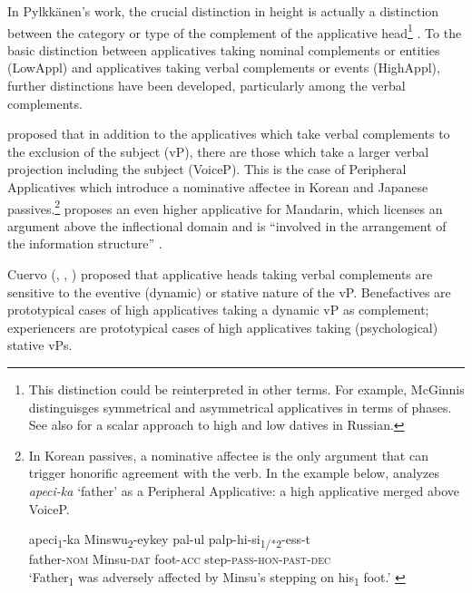 \documentclass[output=paper,colorlinks,citecolor=brown,nonflat]{./langscibook}
\begin{document}
In Pylkkänen’s work, the crucial distinction in height is actually a distinction between the category or type of the complement of the applicative head\footnote{This distinction could be reinterpreted in other terms. For example, McGinnis distinguisges symmetrical and asymmetrical applicatives in terms of phases. See also \citet{BonehNash2017} for a scalar approach to high and low datives in Russian.} . To the basic distinction between applicatives taking nominal complements or entities (LowAppl) and applicatives taking verbal complements or events (HighAppl), further distinctions have been developed, particularly among the verbal complements. 

\citet{Kim2011high} proposed that in addition to the applicatives which take verbal complements to the exclusion of the subject (vP), there are those which take a larger verbal projection including the subject (VoiceP). This is the case of Peripheral Applicatives which introduce a nominative affectee in Korean and Japanese passives.\footnote{In Korean passives, a nominative affectee is the only argument that can trigger honorific agreement with the verb. In the example below, \citet{Kim2012affectees} analyzes \textit{apeci-ka} ‘father’ as a Peripheral Applicative: a high applicative merged above VoiceP.

\ea%
    \gll apeci\textsubscript{1}-ka Minswu\textsubscript{2}-eykey pal-ul palp-hi-si\textsubscript{1/*2}-ess-t\\
    father\textsc{-nom}  Minsu\textsc{-dat} foot\textsc{-acc}   step\textsc{-pass-hon-past-dec}\\
    \glt ‘Father\textsubscript{1} was adversely affected by Minsu’s stepping on his\textsubscript{1} foot.’  \citep{Kim2012affectees}
    \z
} \citet{Tsai2018} proposes an even higher applicative for Mandarin, which licenses an argument above the inflectional domain and is “involved in the arrangement of the information structure” \citep[18]{Tsai2018}. 


Cuervo (\citeyear{Cuervo2003}, \citeyear{Cuervo2011}, \citeyear{Cuervo2015Chapter}) proposed that applicative heads taking verbal complements are sensitive to the eventive (dynamic) or stative nature of the vP. Benefactives are prototypical cases of high applicatives taking a dynamic vP as complement; experiencers are prototypical cases of high applicatives taking (psychological) stative vPs. 
\end{document}
